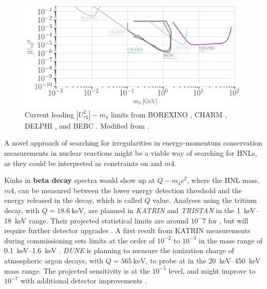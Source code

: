 \begin{figure}[t]
    \includegraphics{figures/hnl_simulation/theory/UtauN_majorana.png}
      \caption[Current leading $|U_{\tau4}^2|-m_4$ limits]{Current leading $|U_{\tau4}^2|-m_4$ limits from BOREXINO \cite{Plestid:2020vqf}, CHARM \cite{Orloff:2002de, Boiarska:2021yho}, DELPHI \cite{DELPHI:1996qcc}, and BEBC \cite{Barouki:2022bkt}. Modified from \cite{hoster_limitFernandez-Martinez:2023phj}.}
\end{figure}

A novel approach of searching for irregularities in energy-momentum conservation measurements in nuclear reactions might be a viable way of searching for HNLs, as they could be interpreted as constraints on  and $m4$.

Kinks in \textbf{beta decay} spectra would show up at $Q-m_4c^2$, where the HNL mass, $m4$, can be measured between the lower energy detection threshold and the energy released in the decay, which is called $Q$ value. Analyses using the tritium decay, with $Q=\SI{18.6}{\kilo\electronvolt}$, are planned in \textit{KATRIN}  and \textit{TRISTAN}  in the \SIrange{1}{18}{\kilo\electronvolt} range. Their projected statistical limits are around $10^-7$ for , but will require further detector upgrades \cite{Mertens_2019}. A first result from KATRIN measurements during commissioning sets limits at the order of $10^{-2}$ to $10^{-3}$ in the mass range of \SIrange{0.1}{1.6}{\kilo\electronvolt} . \textit{DUNE} is planning to measure the ionization charge of atmospheric argon decays, with $Q=\SI{565}{\kilo\electronvolt}$, to probe  at in the \SIrange{20}{450}{\kilo\electronvolt} mass range. The projected sensitivity is at the $10^{-5}$ level, and might improve to $10^{-7}$ with additional detector improvements .

